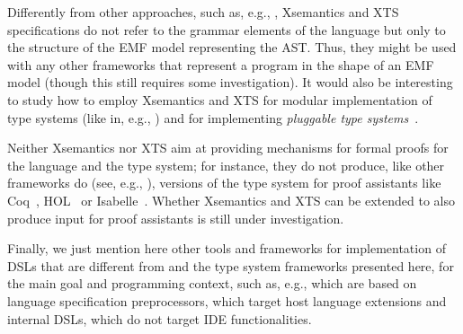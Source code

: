 Differently from other approaches, such as, e.g.,
\cite{Centaur,MPS,ASFSDF,Ruler,PLTRedex,EriLex,Neverlang2010}, Xsemantics and
XTS specifications do not refer to the grammar elements of the language but only
to the structure of the EMF model representing the AST.  Thus, they might be
used with any other frameworks that represent a program in the shape of an EMF
model (though this still requires some investigation).
It would also be interesting to study how to employ Xsemantics and XTS for
modular implementation of type systems (like in, e.g.,
\cite{JastAdd,Neverlang2010,Spoofax2010}) and for implementing \emph{pluggable
type systems}~\cite{Brac04a}.

Neither Xsemantics nor XTS aim at providing mechanisms for formal proofs for the
language and the type system; for instance, they do not produce, like other
frameworks do (see, e.g., \cite{Ott}), versions of the type system for proof
assistants like Coq~\cite{Coq}, HOL~\cite{HOL} or Isabelle~\cite{Isabelle}.
Whether Xsemantics and XTS can be extended to also produce input for proof
assistants is still under investigation.

Finally, we just mention here other tools and frameworks for implementation of
DSLs that are different from \xtext{} and the type system frameworks presented
here, for the main goal and programming context, such as, e.g.,
\cite{JST98,MetaBorg06,MontiCore10} which are based on language specification
preprocessors, \cite{XMF08,LanguageBoxes09} which target host language
extensions and internal DSLs, \cite{ASFSDF,Ruler,PLTRedex} which do not target
IDE functionalities.